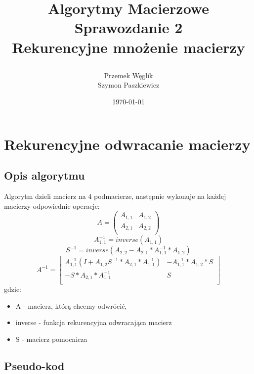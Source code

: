 \documentclass{article}
\title {
        Algorytmy Macierzowe \\
        Sprawozdanie 2 \\
        Rekurencyjne mnożenie macierzy

}
\author{Przemek Węglik \\ Szymon Paszkiewicz}
\date{\today}
\begin{document}
\maketitle

\tableofcontents

\newpage

\section{Rekurencyjne odwracanie macierzy}

\subsection{Opis algorytmu}
\qquad Algorytm dzieli macierz na 4 podmacierze, następnie wykonuje na każdej macierzy odpowiednie operacje:
\begin{equation}
A = 
     \begin{pmatrix}
      A_{1,1} & A_{1,2}  \\
      A_{2,1} & A_{2,2} \\
     \end{pmatrix}
\end{equation}
\begin{equation}
A_{1,1}^{-1} = inverse(A_{1,1})
\end{equation}
\begin{equation}
S^{-1} = inverse(A_{2,2} - A_{2,1} * A_{1,1}^{-1} * A_{1,2})
\end{equation}
\begin{equation}
A^{-1} =      
\begin{bmatrix}
      A_{1,1}^{-1}(I + A_{1,2}S^{-1} * A_{2,1} * A_{1,1}^{-1}) &
      -A_{1,1}^{-1} * A_{1,2} * S  \\
      -S * A_{2,1} * A_{1,1}^{-1} & S \\
    \end{bmatrix}
\end{equation}
gdzie:
\begin{itemize}
    \item[] A - macierz, którą chcemy odwrócić,
    \item[] inverse - funkcja rekurencyjna odwracająca macierz
    \item[] S - macierz pomocnicza
    
\end{itemize}

\subsection{Pseudo-kod}
\end{document}
